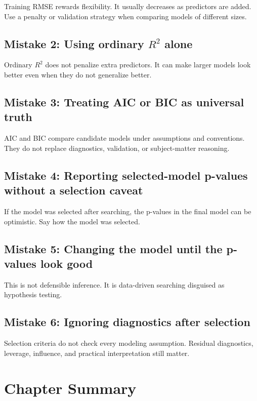 Training RMSE rewards flexibility.  It usually decreases as predictors are added.  Use a penalty or validation strategy when comparing models of different sizes.

\subsection*{Mistake 2: Using ordinary \texorpdfstring{\(R^2\)}{R-squared} alone}

Ordinary \(R^2\) does not penalize extra predictors.  It can make larger models look better even when they do not generalize better.

\subsection*{Mistake 3: Treating AIC or BIC as universal truth}

AIC and BIC compare candidate models under assumptions and conventions.  They do not replace diagnostics, validation, or subject-matter reasoning.

\subsection*{Mistake 4: Reporting selected-model p-values without a selection caveat}

If the model was selected after searching, the p-values in the final model can be optimistic.  Say how the model was selected.

\subsection*{Mistake 5: Changing the model until the p-values look good}

This is not defensible inference.  It is data-driven searching disguised as hypothesis testing.

\subsection*{Mistake 6: Ignoring diagnostics after selection}

Selection criteria do not check every modeling assumption.  Residual diagnostics, leverage, influence, and practical interpretation still matter.

\section{Chapter Summary}

